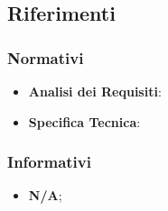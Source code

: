 	\subsection{Riferimenti} %
	\label{sub:riferimenti}
		\subsubsection{Normativi} %
		\label{ssub:normativi}
			\begin{itemize}
				\item \textbf{Analisi dei Requisiti}: \docNameVersionAdR
				\item \textbf{Specifica Tecnica}: \docNameVersionST
			\end{itemize}

		\subsubsection{Informativi} %
		\label{ssub:informativi}
			\begin{itemize}
				\item \textbf{N/A};
			\end{itemize}
